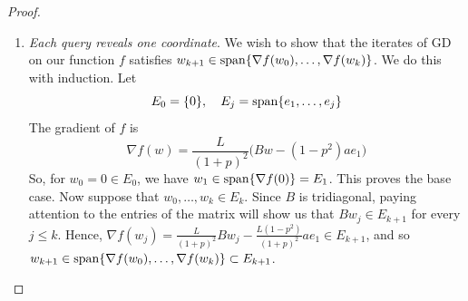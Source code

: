 \begin{proof}
\begin{enumerate}
			\item \textit{Each query reveals one coordinate}. We wish to show that the iterates of GD on our function $f$ satisfies $w_{k+1} \in \operatorname{span}\{\nabla f(w_0), \ldots, \nabla f(w_k)\}$. We do this with induction. Let 
				\begin{equation}
					E_0 = \{0\}, \quad E_j = \operatorname{span}\{e_1, \ldots, e_j\} 
				\end{equation}
				The gradient of $f$ is 
				\begin{equation}
					\nabla f(w) = \frac{L}{(1 + p)^2} \big( Bw - (1 - p^2) a e_1 \big) 
				\end{equation}
				So, for $w_0 = 0 \in E_0$, we have $w_1 \in \operatorname{span}\{ \nabla f(0)\} = E_1$. This proves the base case. Now suppose that $w_0, \ldots, w_k \in E_k$. Since $B$ is tridiagonal, paying attention to the entries of the matrix will show us that $Bw_j \in E_{k+1}$ for every $j \leq k$. Hence, $\nabla f(w_j) = \frac{L}{(1 + p)^2} B w_j - \frac{L(1 - p^2)}{(1 + p)^2} a e_1 \in E_{k+1}$, and so $w_{k+1} \in \operatorname{span}\{\nabla f(w_0), \ldots, \nabla f(w_k)\} \subset E_{k+1}$. 


\end{enumerate}
\end{proof}
